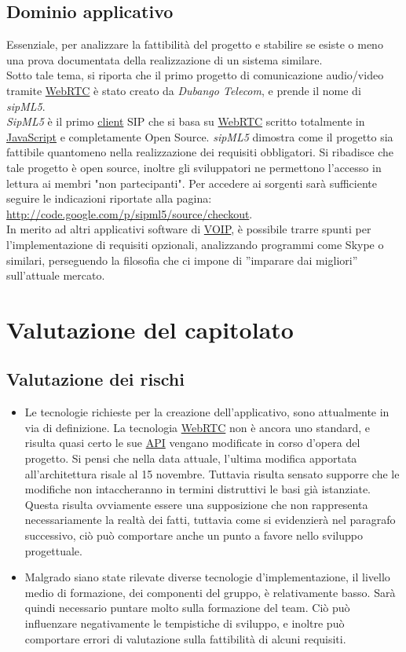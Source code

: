 \subsection{Dominio applicativo}
Essenziale, per analizzare la fattibilità del progetto e stabilire se esiste o meno una prova documentata della realizzazione di un sistema similare.\\ Sotto tale tema, si riporta che il primo progetto di comunicazione audio/video tramite \underline{WebRTC} è stato creato da \textit{Dubango Telecom}, e prende il nome di \textit{sipML5}.\\ \textit{SipML5} è il primo \underline{client} SIP che si basa su \underline{WebRTC} scritto totalmente in \underline{JavaScript} e completamente Open Source. \textit{sipML5} dimostra come il progetto sia fattibile quantomeno nella realizzazione dei requisiti obbligatori. Si ribadisce che tale progetto è open source, inoltre gli sviluppatori ne permettono l'accesso in lettura ai membri "non partecipanti". Per accedere ai sorgenti sarà sufficiente seguire le indicazioni riportate alla pagina: \url{http://code.google.com/p/sipml5/source/checkout}.\\In merito ad altri applicativi software di \underline{VOIP}, è possibile trarre spunti per l'implementazione di requisiti opzionali, analizzando programmi come Skype o similari, perseguendo la filosofia che ci impone di ''imparare dai migliori'' sull'attuale mercato.
\clearpage
\section{Valutazione del capitolato}

\subsection{Valutazione dei rischi}
\begin{itemize}
	\item Le tecnologie richieste per la creazione dell'applicativo, sono attualmente in via di definizione. La tecnologia \underline{WebRTC} non è ancora uno standard, e risulta quasi certo le sue \underline{API} vengano modificate in corso d'opera del progetto. Si pensi che nella data attuale, l'ultima modifica apportata all'architettura risale al 15 novembre. Tuttavia risulta sensato supporre che le modifiche non intaccheranno in termini distruttivi le basi già istanziate. Questa risulta ovviamente essere una supposizione che non rappresenta necessariamente la realtà dei fatti, tuttavia come si evidenzierà nel paragrafo successivo, ciò può comportare anche un punto a favore nello sviluppo progettuale.
	\item Malgrado siano state rilevate diverse tecnologie d'implementazione, il livello medio di formazione, dei componenti del gruppo, è relativamente basso. Sarà quindi necessario puntare molto sulla formazione del team. Ciò può influenzare negativamente le tempistiche di sviluppo, e inoltre può comportare errori di valutazione sulla fattibilità di alcuni requisiti.
\end{itemize}

